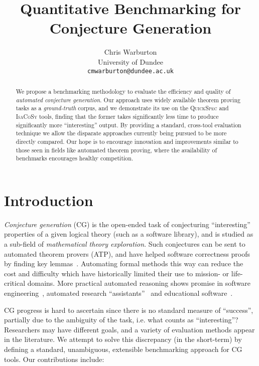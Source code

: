 \documentclass[]{default}
\title{Quantitative Benchmarking for Conjecture Generation}
\author{
          Chris Warburton \\
      University of Dundee \\
      \texttt{cmwarburton@dundee.ac.uk}
    }
\date{}
\begin{document}
\maketitle
\begin{abstract}
  We propose a benchmarking methodology to evaluate the efficiency and quality
  of \emph{automated conjecture generation}. Our approach uses widely available
  theorem proving tasks as a \emph{ground-truth} corpus, and we demonstrate its
  use on the \textsc{QuickSpec} and \textsc{IsaCoSy} tools, finding that the
  former takes significantly less time to produce significantly more
  ``interesting'' output. By providing a standard, cross-tool evaluation
  technique we allow the disparate approaches currently being pursued to be more
  directly compared. Our hope is to encourage innovation and improvements
  similar to those seen in fields like automated theorem proving, where the
  availability of benchmarks encourages healthy competition.
\end{abstract}

\section{Introduction}\label{introduction}

\emph{Conjecture generation} (CG) is the open-ended task of conjecturing
``interesting'' properties of a given logical theory (such as a software
library), and is studied as a sub-field of \emph{mathematical theory
  exploration}. Such conjectures can be sent to automated theorem provers (ATP),
and have helped software correctness proofs by finding key
lemmas~\cite{Claessen.Johansson.Rosen.ea:2013}. Automating formal methods this
way can reduce the cost and difficulty which have historically limited their use
to mission- or life-critical domains. More practical automated reasoning shows
promise in software
engineering~\cite{McKinna:2006,chlipala2011certified}, automated research
``assistants''~\cite{McCarthy_Programs59,lenat:77,benzmuller1997omegamega} and
educational software~\cite{conf/ijcai/TrybulecB85,hendriks2010teaching}.

CG progress is hard to ascertain since there is no standard measure of
``success'', partially due to the ambiguity of the task, i.e. what counts as
``interesting''? Researchers may have different goals, and a variety of
evaluation methods appear in the literature. We attempt to solve this
discrepancy (in the short-term) by defining a standard, unambiguous, extensible
benchmarking approach for CG tools. Our contributions include:
\end{document}
